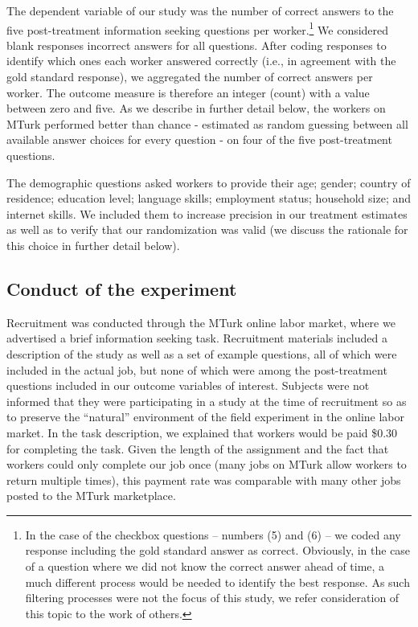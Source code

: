 \documentclass{chi2009}
\begin{document}
The dependent variable of our study was the number of correct answers
to the five post-treatment information seeking questions per
worker.\footnote{In the case of the checkbox questions -- numbers (5)
  and (6) -- we coded any response including the gold standard answer
  as correct. Obviously, in the case of a question where we did not
  know the correct answer ahead of time, a much different process
  would be needed to identify the best response. As such filtering
  processes were not the focus of this study, we refer consideration
  of this topic to the work of others.\cite{snow2008cheap}} We
considered blank responses incorrect answers for all questions. After
coding responses to identify which ones each worker answered correctly
(i.e., in agreement with the gold standard response), we aggregated
the number of correct answers per worker. The outcome measure is
therefore an integer (count) with a value between zero and five. As we
describe in further detail below, the workers on MTurk performed
better than chance - estimated as random guessing between all
available answer choices for every question - on four of the five
post-treatment questions.

The demographic questions asked workers to provide their age; gender;
country of residence; education level; language skills; employment
status; household size; and internet skills. We included them to
increase precision in our treatment estimates as well as to verify
that our randomization was valid (we discuss the rationale for this
choice in further detail below).

\subsection{Conduct of the experiment}

Recruitment was conducted through the MTurk online labor market, where
we advertised a brief information seeking task. Recruitment materials
included a description of the study as well as a set of example
questions, all of which were included in the actual job, but none of
which were among the post-treatment questions included in our outcome
variables of interest. Subjects were not informed that they were
participating in a study at the time of recruitment so as to preserve
the ``natural'' environment of the field experiment in the online
labor market. In the task description, we explained that workers would
be paid \$0.30 for completing the task. Given the length of the
assignment and the fact that workers could only complete our job once
(many jobs on MTurk allow workers to return multiple times), this
payment rate was comparable with many other jobs posted to the MTurk
marketplace.
\end{document}
